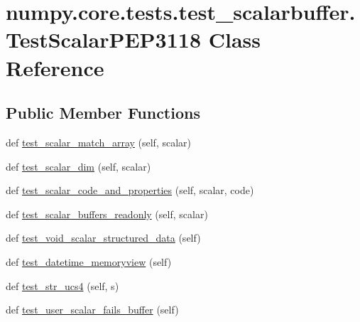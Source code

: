 \hypertarget{classnumpy_1_1core_1_1tests_1_1test__scalarbuffer_1_1TestScalarPEP3118}{}\section{numpy.\+core.\+tests.\+test\+\_\+scalarbuffer.\+Test\+Scalar\+P\+E\+P3118 Class Reference}
\label{classnumpy_1_1core_1_1tests_1_1test__scalarbuffer_1_1TestScalarPEP3118}
\subsection*{Public Member Functions}
\begin{DoxyCompactItemize}
\item 
def \hyperlink{classnumpy_1_1core_1_1tests_1_1test__scalarbuffer_1_1TestScalarPEP3118_ae80f0d79860913c5e2c69dfd44691cd7}{test\+\_\+scalar\+\_\+match\+\_\+array} (self, scalar)
\item 
def \hyperlink{classnumpy_1_1core_1_1tests_1_1test__scalarbuffer_1_1TestScalarPEP3118_ac715c9063fcdff79e6152372c4882d9b}{test\+\_\+scalar\+\_\+dim} (self, scalar)
\item 
def \hyperlink{classnumpy_1_1core_1_1tests_1_1test__scalarbuffer_1_1TestScalarPEP3118_a7f3d2f5d4dc09074ac7df54ddf84367f}{test\+\_\+scalar\+\_\+code\+\_\+and\+\_\+properties} (self, scalar, code)
\item 
def \hyperlink{classnumpy_1_1core_1_1tests_1_1test__scalarbuffer_1_1TestScalarPEP3118_aaef10dad449f228dc39ea249617a616a}{test\+\_\+scalar\+\_\+buffers\+\_\+readonly} (self, scalar)
\item 
def \hyperlink{classnumpy_1_1core_1_1tests_1_1test__scalarbuffer_1_1TestScalarPEP3118_aac831cbec137a74983f24d1bafb085eb}{test\+\_\+void\+\_\+scalar\+\_\+structured\+\_\+data} (self)
\item 
def \hyperlink{classnumpy_1_1core_1_1tests_1_1test__scalarbuffer_1_1TestScalarPEP3118_a35d7bb150d74e4e360089b82aa2e4988}{test\+\_\+datetime\+\_\+memoryview} (self)
\item 
def \hyperlink{classnumpy_1_1core_1_1tests_1_1test__scalarbuffer_1_1TestScalarPEP3118_a4e5a306b7b32e75aaec597211338ee4f}{test\+\_\+str\+\_\+ucs4} (self, s)
\item 
def \hyperlink{classnumpy_1_1core_1_1tests_1_1test__scalarbuffer_1_1TestScalarPEP3118_ab1f373e49970248410d9ccfc089dc315}{test\+\_\+user\+\_\+scalar\+\_\+fails\+\_\+buffer} (self)
\end{DoxyCompactItemize}
